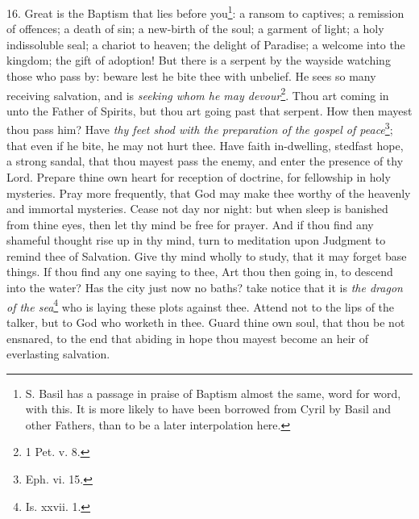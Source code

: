 16. Great is the Baptism that lies before you\footnote{S. Basil has a passage in praise of Baptism almost the same, word for word, with this. It is more likely to have been borrowed from Cyril by Basil and other Fathers, than to be a later interpolation here.}: a ransom to captives; a remission of offences; a death of sin; a new-birth of the soul; a garment of light; a holy indissoluble seal; a chariot to heaven; the delight of Paradise; a welcome into the kingdom; the gift of adoption! But there is a serpent by the wayside watching those who pass by: beware lest he bite thee with unbelief. He sees so many receiving salvation, and is \emph{seeking whom he may devour}\footnote{1 Pet. v. 8.}. Thou art coming in unto the Father of Spirits, but thou art going past that serpent. How then mayest thou pass him? Have \emph{thy feet shod with the preparation of the gospel of peace}\footnote{Eph. vi. 15.}; that even if he bite, he may not hurt thee. Have faith in-dwelling, stedfast hope, a strong sandal, that thou mayest pass the enemy, and enter the presence of thy Lord. Prepare thine own heart for reception of doctrine, for fellowship in holy mysteries. Pray more frequently, that God may make thee worthy of the heavenly and immortal mysteries. Cease not day nor night: but when sleep is banished from thine eyes, then let thy mind be free for prayer. And if thou find any shameful thought rise up in thy mind, turn to meditation upon Judgment to remind thee of Salvation. Give thy mind wholly to study, that it may forget base things. If thou find any one saying to thee, Art thou then going in, to descend into the water? Has the city just now no baths? take notice that it is \emph{the dragon of the sea}\footnote{Is. xxvii. 1.} who is laying these plots against thee. Attend not to the lips of the talker, but to God who worketh in thee. Guard thine own soul, that thou be not ensnared, to the end that abiding in hope thou mayest become an heir of everlasting salvation.


